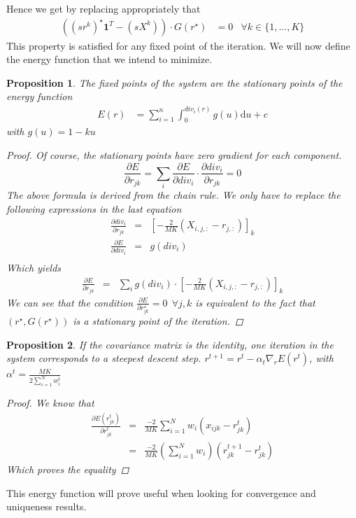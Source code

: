 \documentclass[12pt,a4paper]{article}
\newtheorem{proposition}{Proposition}
\begin{document}
Hence we get by replacing appropriately that
\begin{align*}
((sr^k)^{\star} \mathbf{1}^T - (sX^k))\cdot G(r^{\star}) &= 0 & \forall k\in \{1,\dots,K\}
\end{align*}
This property is satisfied for any fixed point of the iteration. We will now define the energy function that we intend to minimize.
\begin{proposition}
The fixed points of the system are the stationary points of the energy function
\begin{align}
E(r) &=  \sum_{i=1}^n \int_0^{div_i(r)}g(u) \mathrm{d}u + c \label{eq:energy}
\end{align}
with $g(u) = 1 -ku$
\begin{proof}
Of course, the stationary points have zero gradient for each component.
$$
\frac{\partial E}{\partial r_{jk}} =  \sum_{i}\frac{\partial E}{\partial div_i} \cdot \frac{\partial div_i}{\partial r_{jk}} = 0
$$
The above formula is derived from the chain rule. We only have to replace the following expressions in the last equation
\begin{eqnarray*}
\frac{\partial div_i}{\partial r_{jk}} & = & \left[-\frac{2}{MK} (X_{i,j,:}-r_{j,:})\right]_{k} \\
\frac{\partial E}{\partial div_i} & = & g(div_i)\\
\end{eqnarray*}
Which yields
\begin{eqnarray*}
\frac{\partial E}{\partial r_{jk}} & = & \sum_{i}g(div_i) \cdot \left[-\frac{2}{MK} (X_{i,j,:}-r_{j,:})\right]_{k} 
\end{eqnarray*}
We can see that the condition $\frac{\partial E}{\partial r^{\star}_{jk}}=0 \:\: \forall j,k$ is equivalent to the fact that $(r^{\star},G(r^{\star}))$ is a stationary point of the iteration.
\end{proof}
\end{proposition}
\begin{proposition}
If the covariance matrix is the identity, one iteration in the system corresponds to a steepest descent step.
$r^{t+1} = r^t - \alpha_t \nabla_r E(r^t)$, with $\alpha^t = \frac{MK}{2 \sum_{i=1}^N w^t_i}$
\begin{proof}
We know that 
\begin{eqnarray*}
\frac{\partial E(r^t_{jk})}{\partial r^t_{jk}} & = & \frac{-2}{MK} \sum_{i=1}^N w_i (x_{ijk}-r^t_{jk})\\
& = & \frac{-2}{MK} (\sum_{i=1}^N w_i)(r^{t+1}_{jk}- r^t_{jk})
\end{eqnarray*}
Which proves the equality
\end{proof}
\end{proposition}
This energy function will prove useful when looking for convergence and uniqueness results.
\end{document}
